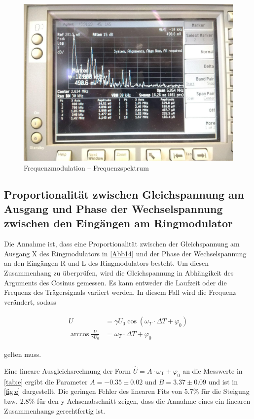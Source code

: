 \begin{figure}
	\centering
	\includegraphics[width=\textwidth]{img/Aufgabenteil_d.jpg}
	\caption{Frequenzmodulation -- Frequenzspektrum}
	\label{d2}
\end{figure}

\subsection{Proportionalität zwischen Gleichspannung am Ausgang und Phase der Wechselspannung zwischen den Eingängen am Ringmodulator}

Die Annahme ist, dass eine Proportionalität zwischen der Gleichspannung am Ausgang X des Ringmodulators in \autoref{Abb14} und der Phase der Wechselspannung an den Eingängen R und L des Ringmodulators besteht. Um diesen Zusammenhang zu überprüfen, wird die Gleichspannung in Abhängikeit des Arguments des Cosinus gemessen. Es kann entweder die Laufzeit oder die Frequenz des Trägersignals variiert werden. In diesem Fall wird die Frequenz verändert, sodass

\begin{align}
\begin{split}
	U &= \gamma U_0 \cos(\omega_T \cdot \Delta T + \varphi_0)\\
	\arccos \frac{U}{\gamma U_0} &= \omega_T \cdot \Delta T + \varphi_0
\end{split}
\end{align}

gelten muss.



Eine lineare Ausgleichsrechnung der Form $\hat{U} = A \cdot \omega_\text{T} + \varphi_0$ an die Messwerte in \autoref{tab:e} ergibt die Parameter $A = -0.35 \pm 0.02$ und $B = 3.37 \pm 0.09$ und ist in \autoref{fig:e} dargestellt. Die geringen Fehler des linearen Fits von 5.7\% für die Steigung bzw. 2.8\% für den y-Achsenabschnitt zeigen, dass die Annahme eines ein linearen Zusammenhangs gerechtfertig ist.

